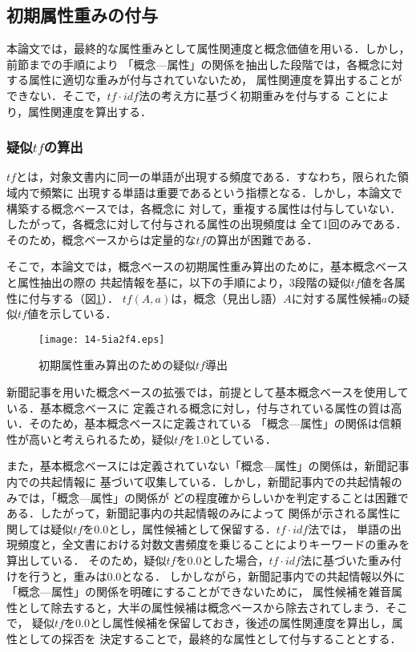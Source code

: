 \documentclass[japanese]{jnlp_1.3e}
\begin{document}
\subsection{初期属性重みの付与}

本論文では，最終的な属性重みとして属性関連度と概念価値を用いる．しかし，前節までの手順により
「概念—属性」の関係を抽出した段階では，各概念に対する属性に適切な重みが付与されていないため，
属性関連度を算出することができない．そこで，$\mathit{tf}\cdot\mathit{idf}$法の考え方に基づく初期重みを付与する
ことにより，属性関連度を算出する．

\subsubsection{疑似$\mathit{tf}$の算出}

$\mathit{tf}$とは，対象文書内に同一の単語が出現する頻度である．すなわち，限られた領域内で頻繁に
出現する単語は重要であるという指標となる．しかし，本論文で構築する概念ベースでは，各概念に
対して，重複する属性は付与していない．したがって，各概念に対して付与される属性の出現頻度は
全て1回のみである．そのため，概念ベースからは定量的な$\mathit{tf}$の算出が困難である．

そこで，本論文では，概念ベースの初期属性重み算出のために，基本概念ベースと属性抽出の際の
共起情報を基に，以下の手順により，3段階の疑似$\mathit{tf}$値を各属性に付与する（図\ref{fig:shoki-shinraido}）．
$\mathit{tf}(A,a)$は，概念（見出し語）$A$に対する属性候補$a$の疑似$\mathit{tf}$値を示している．

\begin{figure}[t]
	\begin{center}
	\texttt{[image: 14-5ia2f4.eps]}
		\caption{初期属性重み算出のための疑似$\mathit{tf}$導出}
		\label{fig:shoki-shinraido}
	\end{center}
\end{figure}

新聞記事を用いた概念ベースの拡張では，前提として基本概念ベースを使用している．基本概念ベースに
定義される概念に対し，付与されている属性の質は高い．そのため，基本概念ベースに定義されている
「概念—属性」の関係は信頼性が高いと考えられるため，疑似$\mathit{tf}$を1.0としている．

また，基本概念ベースには定義されていない「概念—属性」の関係は，新聞記事内での共起情報に
基づいて収集している．しかし，新聞記事内での共起情報のみでは，「概念—属性」の関係が
どの程度確からしいかを判定することは困難である．したがって，新聞記事内の共起情報のみによって
関係が示される属性に関しては疑似$\mathit{tf}$を0.0とし，属性候補として保留する．$\mathit{tf}\cdot\mathit{idf}$法では，
単語の出現頻度と，全文書における対数文書頻度を乗じることによりキーワードの重みを算出している．
そのため，疑似$\mathit{tf}$を0.0とした場合，$\mathit{tf}\cdot\mathit{idf}$法に基づいた重み付けを行うと，重みは0.0となる．
しかしながら，新聞記事内での共起情報以外に「概念—属性」の関係を明確にすることができないために，
属性候補を雑音属性として除去すると，大半の属性候補は概念ベースから除去されてしまう．そこで，
疑似$\mathit{tf}$を0.0とし属性候補を保留しておき，後述の属性関連度を算出し，属性としての採否を
決定することで，最終的な属性として付与することとする．
\end{document}
